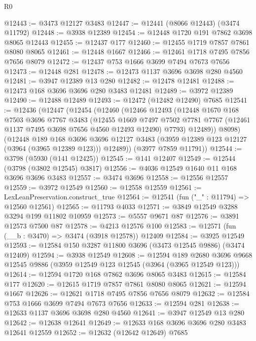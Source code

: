 \begin{lexlean}{R0}
\begin{coremodule}
@12443 := @3473 @12127 @3483
@12447 := @12441 (@8066 @12443) (@3474 @11792)
@12448 := @3938 @12389
@12454 := @12448 @1720 @191 @7862 @3698 @8065 @12443
@12455 := @12437 @177
@12460 := @12455 @1719 @7857 @7861 @8080 @8065
@12461 := @12448 @1667
@12466 := @12461 @1718 @7495 @7856 @7656 @8079
@12472 := @12437 @753 @1666 @3699 @7494 @7673 @7656
@12473 := @12448 @281
@12478 := @12473 @1137 @3696 @3698 @280 @4560
@12481 := @3947 @12389 @13 @280
@12482 := @12478 @12481
@12488 := @12473 @168 @3696 @3696 @280 @3483 @12481
@12489 := @3972 @12389
@12490 := @12488 @12489
@12493 := @12472 (@12482 @12490) @7685
@12541 := @12436
    (@12447
      (@12454
        (@12460
          (@12466
            @12493
            (@12448
              @1670
              @168
              @7503
              @3696
              @7767
              @3483
              (@12455
                @1669
                @7497
                @7502
                @7781
                @7767
                (@12461 @1137 @7495 @3698 @7656 @4560 @12493 @12490)
                @7793)
              @12489))
          @8098)
        (@12448
          @189
          @168
          @3696
          @3696
          @12127
          @3483
          (@3959 @12389 @123 @12127 (@3964 (@3965 @12389 @123)))
          @12489))
      (@3977 @7859 @11791))
@12544 := @3798 (@5930 (@141 @12425))
@12545 := @141 @12407
@12549 := @12544 (@3798 (@3802 @12545) @3817)
@12556 := @4036 @12549 @1640 @11 @168 @3696 @3696 @3483
@12557 := @3474 @3696
@12558 := @12556 @12557
@12559 := @3972 @12549
@12560 := @12558 @12559
@12561 := LexLeanPreservation.construct_true
@12564 := @12541 (fun ("_" : @11794) => @12560 @12561)
@12565 := @11793 @4033
@12571 := @3849 @12549 @3288 @3294 @199 @11802 @10959
@12573 := @5557 @9671 @87
@12576 := @3891 @12573 @7500 @87
@12578 := @4213 @12576 @100
@12583 := @12571 (fun (__b : @3470) => @3474 (@3918 @12578)) @12409
@12584 := @3925 @12549
@12593 := @12584 @150 @3287 @11800 @3696 (@3473 @12545 @9886) (@3474 @12409)
@12594 := @3938 @12549
@12608 := @12594
    @189
    @2680
    @3696
    @9668
    @12545
    @9886
    (@3959 @12549 @123 @12545 (@3964 (@3965 @12549 @123)))
@12614 := @12594 @1720 @168 @7862 @3696 @8065 @3483
@12615 := @12584 @177
@12620 := @12615 @1719 @7857 @7861 @8080 @8065
@12621 := @12594 @1667
@12626 := @12621 @1718 @7495 @7856 @7656 @8079
@12632 := @12584 @753 @1666 @3699 @7494 @7673 @7656
@12633 := @12594 @281
@12638 := @12633 @1137 @3696 @3698 @280 @4560
@12641 := @3947 @12549 @13 @280
@12642 := @12638 @12641
@12649 := @12633 @168 @3696 @3696 @280 @3483 @12641 @12559
@12652 := @12632 (@12642 @12649) @7685

\end{coremodule}
\end{lexlean}
